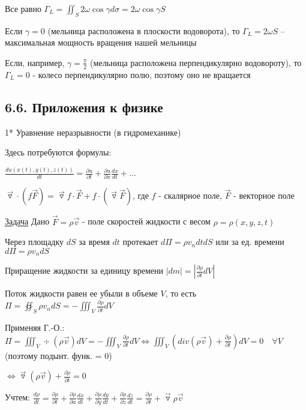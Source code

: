 \documentclass[12pt]{article}
\begin{document}
    Все равно $\Gamma_L = \iint_S 2\omega \cos \gamma d\sigma = 2\omega\cos \gamma S$

    Если $\gamma = 0$ (мельница расположена в плоскости водоворота), то $\Gamma_L = 2\omega S$ -- максимальная мощность вращения нашей мельницы

    Если, например, $\gamma = \frac{\pi}{2}$ (мельница расположена перпендикулярно водовороту), то $\Gamma_L = 0$ - колесо перпендикулярно полю, поэтому оно не вращается

    \subsection{6.6. Приложения к физике}

    1* Уравнение неразрывности (в гидромеханике)

    \Nota Здесь потребуются формулы:

    $\frac{du(x(t), y(t), z(t))}{dt} = \frac{\partial u}{\partial t} + \frac{\partial u}{\partial x}\frac{dx}{dt} + \dots$

    $\overrightarrow{\triangledown} \cdot (f\overrightarrow{F}) = \overrightarrow{\triangledown} f \cdot \overrightarrow{F} + f \cdot (\overrightarrow{\triangledown} \overrightarrow{F})$, где $f$ - скалярное поле, $\overrightarrow{F}$ - векторное поле

    \underline{Задача} Дано $\overrightarrow{F} = \rho \overrightarrow{v}$ - поле скоростей жидкости с весом $\rho = \rho(x, y, z, t)$

    Через площадку $dS$ за время $dt$ протекает $d\Pi = \rho v_n dt dS$ или за ед. времени $d\Pi = \rho v_n dS$

    Приращение жидкости за единицу времени $|dm| = |\frac{\partial \rho}{\partial t} dV|$

    Поток жидкости равен ее убыли в объеме $V$, то есть $\Pi = \oiint_S \rho v_n dS = -\iiint_V \frac{\partial \rho}{\partial t} dV$

    Применяя Г.-О.: $\Pi = \iiint_V \div (\rho \overrightarrow{v}) dV = -\iiint_V \frac{\partial \rho}{\partial t} dV \Longleftrightarrow \iiint_V (div (\rho \overrightarrow{v}) + \frac{\partial \rho}{\partial t}) dV = 0 \quad \forall V$ (поэтому подынт. функ. = 0)

    $\Longleftrightarrow \overrightarrow{\triangledown} (\rho \overrightarrow{v}) + \frac{\partial \rho}{\partial t} = 0$

    Учтем: $\frac{d \rho}{dt} = \frac{\partial \rho}{\partial t} +  \frac{\partial \rho}{\partial x} \frac{dx}{dt} +  \frac{\partial \rho}{\partial y} \frac{dy}{dt} + \frac{\partial \rho}{\partial z} \frac{dz}{dt} = \frac{\partial \rho}{\partial t} + \overrightarrow{\triangledown} \rho \overrightarrow{v}$
\end{document}
